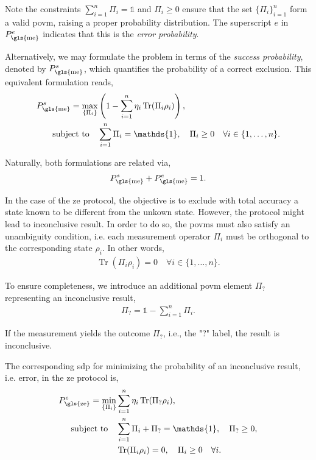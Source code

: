 \documentclass[12pt,letterpaper]{article}
\DeclareMathOperator{\tr}{Tr}
\begin{document}
Note the constraints $\sum_{i=1}^n \Pi_i = \mathds{1}$ and $\Pi_i \geq 0$ ensure that the set $\{\Pi_i\}_{i=1}^n$ form a valid \gls{povm}, raising a proper probability distribution. The superscript $e$ in $P_{\text{\gls{me}}}^e$ indicates that this is the \emph{error probability}.

Alternatively, we may formulate the problem in terms of the \emph{success probability}, denoted by $P_{\text{\gls{me}}}^s$, which quantifies the probability of a correct exclusion. This equivalent formulation reads,
\begin{align*}
	P_{\text{\gls{me}}}^s = \max_{\left\{\Pi_i\right\}} &\left(1 - \sum_{i=1}^n \eta_i\tr(\Pi_i \rho_i)\right),\\
	\text{subject to} \quad & \sum_{i=1}^n \Pi_i = \mathds{1}, \quad \Pi_i \geq 0 \quad \forall i \in \{1, \dots, n\}.
\end{align*}

Naturally, both formulations are related via,
\begin{align*}
P_{\text{\gls{me}}}^s + P_{\text{\gls{me}}}^e = 1.
\end{align*}

In the case of the \gls{ze} protocol, the objective is to exclude with total accuracy a state known to be different from the unkown state. However, the protocol might lead to inconclusive result. In order to do so, the \gls{povm}s must also satisfy an unambiguity condition, i.e. each measurement operator $\Pi_i$ must be orthogonal to the corresponding state $\rho_i$. In other words,
\begin{align*}
\tr(\Pi_i \rho_i) = 0 \quad \forall i \in \{1, \dots, n\}.
\end{align*}

To ensure completeness, we introduce an additional \gls{povm} element $\Pi_?$ representing an inconclusive result,
\begin{align*}
\Pi_? = \mathds{1} - \sum_{i=1}^n \Pi_i.
\end{align*}

If the measurement yields the outcome $\Pi_?$, i.e., the "?" label, the result is inconclusive.

The corresponding \gls{sdp} for minimizing the probability of an inconclusive result, i.e. error, in the \gls{ze} protocol is,
\begin{align*}
	P_{\text{\gls{ze}}}^e = \min_{\left\{\Pi_i\right\}} &\sum_{i=1}^n \eta_i\tr(\Pi_? \rho_i),\\
	\text{subject to} \quad & \sum_{i=1}^n \Pi_i + \Pi_? = \mathds{1}, \quad \Pi_? \geq 0,\\
	& \tr(\Pi_i \rho_i) = 0, \quad \Pi_i \geq 0 \quad \forall i.
\end{align*}
\end{document}
